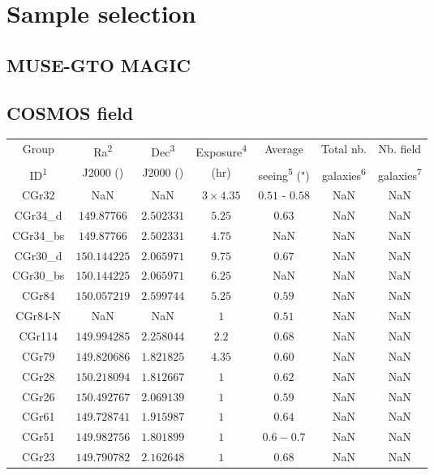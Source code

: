 \clearpage
\section{Sample selection}
\label{sec:Sample_selection}

\subsection{MUSE-GTO MAGIC}

\subsection{COSMOS field}

\begin{table}[htbp]

	\hspace{50pt}

	\begin{tabular}{ccccccc}
	\hline
	Group & Ra\textsuperscript{2} & Dec\textsuperscript{3} & Exposure\textsuperscript{4}  & Average & Total nb. & Nb. field \\
	
	ID\textsuperscript{1} & J2000 (\degree) & J2000 (\degree) & (hr) & seeing\textsuperscript{5} (") & galaxies\textsuperscript{6} & galaxies\textsuperscript{7} \\	
	
	\hline
	\hline
	CGr32 & NaN & NaN & $3 \times 4.35$ & $0.51$ - $0.58$ & NaN & NaN \\
	\hline
	CGr34\_d & $149.87766$ & $2.502331$ & $5.25$ & $0.63$ & NaN & NaN \\
	\hline
	CGr34\_bs & $149.87766$ & $2.502331$ & $4.75$ & NaN & NaN & NaN \\
	\hline
	CGr30\_d & $150.144225$ & $2.065971$ & $9.75$ & $0.67$ & NaN & NaN \\
	\hline
	CGr30\_bs & $150.144225$ & $2.065971$ & $6.25$ & NaN & NaN & NaN \\
	\hline
	CGr84 & $150.057219$ & $2.599744$ & $5.25$ & $0.59$ & NaN & NaN \\
	\hline
	CGr84-N & NaN & NaN & $1$ & $0.51$ & NaN & NaN \\
	\hline
	CGr114 & $149.994285$ & $2.258044$ & $2.2$ & $0.68$ & NaN & NaN \\
	\hline
	CGr79 & $149.820686$ & $1.821825$ & $4.35$ & $0.60$ & NaN & NaN \\
	\hline
	CGr28 & $150.218094$ & $1.812667$ & $1$ & $0.62$ & NaN & NaN \\
	\hline
	CGr26 & $150.492767$ & $2.069139$ & $1$ & $0.59$ & NaN & NaN \\
	\hline
	CGr61 & $149.728741$ & $1.915987$ & $1$ & $0.64$ & NaN & NaN \\
	\hline
	CGr51 & $149.982756$ & $1.801899$ & $1$ & $0.6-0.7$ & NaN & NaN \\
	\hline
	CGr23 & $149.790782$ & $2.162648$ & $1$ & $0.68$ & NaN & NaN \\
	\hline
	

\end{tabular}
\end{table}
